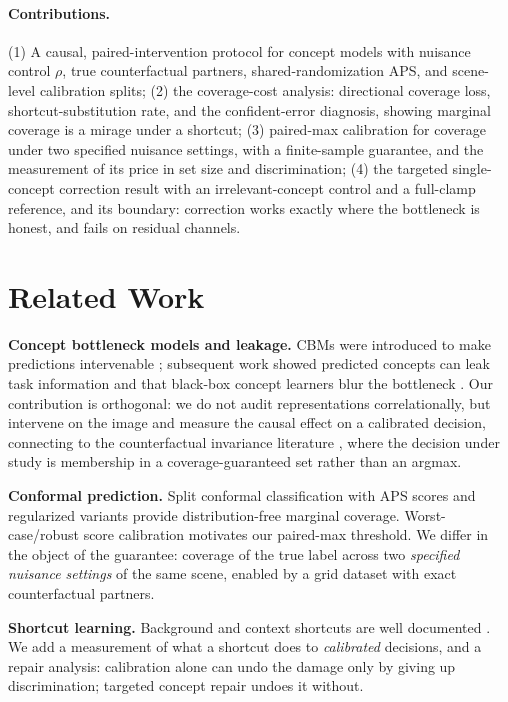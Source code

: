 \documentclass[11pt]{article}
\begin{document}
\paragraph{Contributions.}
(1) A causal, paired-intervention protocol for concept models with nuisance
control $\rho$, true counterfactual partners, shared-randomization APS, and
scene-level calibration splits;
(2) the coverage-cost analysis: directional coverage loss, shortcut-substitution
rate, and the confident-error diagnosis, showing marginal coverage is a mirage
under a shortcut;
(3) paired-max calibration for coverage under two specified nuisance settings,
with a finite-sample guarantee, and the measurement of its price in set size
and discrimination;
(4) the targeted single-concept correction result with an irrelevant-concept
control and a full-clamp reference, and its boundary: correction works exactly
where the bottleneck is honest, and fails on residual channels.

\section{Related Work}
\label{sec:related}

\textbf{Concept bottleneck models and leakage.} CBMs were introduced to make
predictions intervenable \citep{koh2020concept}; subsequent work showed
predicted concepts can leak task information \citep{margeloiu2021concept} and
that black-box concept learners blur the bottleneck
\citep{mahinpei2021promises}. Our contribution is orthogonal: we do not audit
representations correlationally, but intervene on the image and measure the
causal effect on a calibrated decision, connecting to the counterfactual
invariance literature \citep{veitch2021counterfactual}, where the decision
under study is membership in a coverage-guaranteed set rather than an argmax.

\textbf{Conformal prediction.} Split conformal classification
\citep{vovk2005algorithmic} with APS scores \citep{romano2020classification}
and regularized variants \citep{angelopoulos2021uncertainty} provide
distribution-free marginal coverage. Worst-case/robust score calibration
\citep{zargarbashi2024robust} motivates our paired-max threshold. We differ in
the object of the guarantee: coverage of the true label across two \emph{specified
nuisance settings} of the same scene, enabled by a grid dataset with exact
counterfactual partners.

\textbf{Shortcut learning.} Background and context shortcuts are well
documented \citep{geirhos2020shortcut,beery2018recognition}. We add a
measurement of what a shortcut does to \emph{calibrated} decisions, and a
repair analysis: calibration alone can undo the damage only by giving up
discrimination; targeted concept repair undoes it without.
\end{document}
